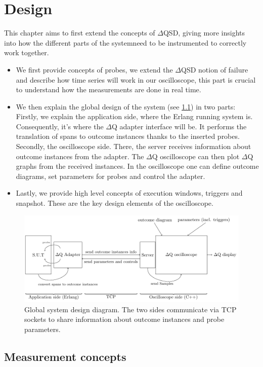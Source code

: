 \chapter{Design}
    This chapter aims to first extend the concepts of $\Delta$QSD, giving more insights into how the different parts of the systemneed to be instrumented to correctly work together.
    \begin{itemize}
        \item We first provide concepts of probes, we extend the $\Delta$QSD notion of failure and describe how time series will work in our oscilloscope, this part is crucial to understand how the measurements are done in real time.
        \item We then explain the global design of the system (see \cref{fig:sys_diag}) in two parts: \\
            Firstly, we explain the application side, where the Erlang running system is. Consequently, it's where the $\Delta$Q adapter interface will be. It performs the translation of spans to outcome instances thanks to the inserted probes. \\
            Secondly, the oscilloscope side. There, the server receives information about outcome instances from the adapter. The $\Delta$Q oscilloscope can then plot $\Delta$Q graphs from the received instances. In the oscilloscope one can define outcome diagrams, set parameters for probes and control the adapter.
        \item Lastly, we provide high level concepts of execution windows, triggers and snapshot. These are the key design elements of the oscilloscope. 
    \end{itemize}

    \begin{figure}[H]
        \begin{center}
            \includegraphics[scale = 0.8]{tikz/sut-stub-osc.pdf}
        \end{center}
        \caption{Global system design diagram. The two sides communicate via TCP sockets to share information about outcome instances and probe parameters.}
        \label{fig:sys_diag}
    \end{figure}

    \section{Measurement concepts}
    
    
    
      
    
    
     
    
